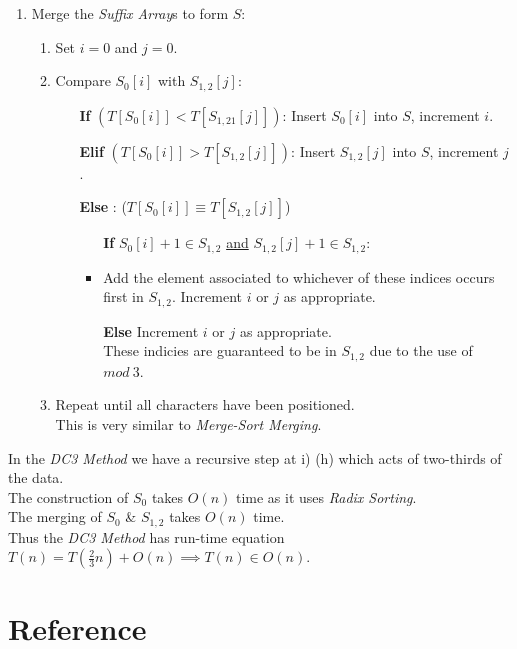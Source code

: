 \documentclass[11pt,a4paper]{article}
\begin{document}
\begin{enumerate}
\begin{enumerate}
	\end{enumerate}
	\item Merge the \textit{Suffix Array}s to form $S$:
	\begin{enumerate}
		\item Set $i=0$ and $j=0$.
		\item Compare $S_0[i]$ with $S_{1,2}[j]$:
		\begin{itemize}
			\item[\textbf{If}] $(T[S_0[i]]<T[S_{1,21}[j]])$: Insert $S_0[i]$ into $S$, increment $i$.
			\item[\textbf{Elif}] $(T[S_0[i]]>T[S_{1,2}[j]])$: Insert $S_{1,2}[j]$ into $S$, increment $j$.
			\item[\textbf{Else}]: (\ie $T[S_0[i]]\equiv T[S_{1,2}[j]]$)
			\begin{itemize}
				\item[\textbf{If}] $S_0[i]+1\in S_{1,2}$ \underline{and} $S_{1,2}[j]+1\in S_{1,2}$:
				\item Add the element associated to whichever of these indices occurs first in $S_{1,2}$. Increment $i$ or $j$ as appropriate.
				\item[\textbf{Else}]  Increment $i$ or $j$ as appropriate.\\
				\nb These indicies are guaranteed to be in $S_{1,2}$ due to the use of $mod\ 3$.
				
			\end{itemize}
		\end{itemize}
		\item Repeat until all characters have been positioned.\\
		\nb This is very similar to \textit{Merge-Sort Merging}.
	\end{enumerate}
\end{enumerate}

In the \textit{DC3 Method} we have a recursive step at i) (h) which acts of two-thirds of the data.\\
The construction of $S_0$ takes $O(n)$ time as it uses \textit{Radix Sorting}.\\
The merging of $S_0$ \& $S_{1,2}$ takes $O(n)$ time.\\
Thus the \textit{DC3 Method} has run-time equation $T(n)=T\left(\frac{2}{3}n\right)+O(n)\implies T(n)\in O(n)$.

\newpage
\setcounter{section}{-1}
\section{Reference}
\end{document}
